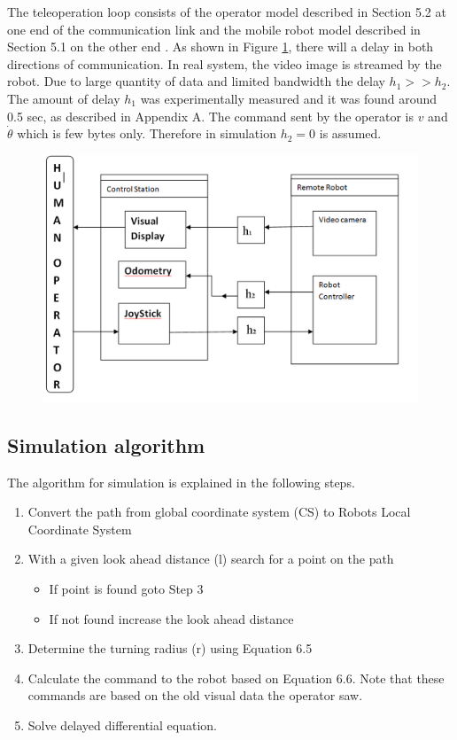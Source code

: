 The teleoperation loop consists of the operator model described in Section 5.2 at one end of the communication link and the mobile robot model described in Section 5.1 on the other end . As shown in Figure \ref{fig:teleloop}, there will a delay in both directions of communication. In real system, the video image is streamed  by the robot. Due to large quantity of data and limited bandwidth the delay $h_1>>h_2$. The amount of delay $h_1$ was experimentally measured  and it was found around 0.5 sec, as described in Appendix A. The command sent by the operator is  $v$ and $\dot{\theta}$ which is few bytes only.  Therefore in simulation  $h_2=0$ is assumed.


\begin{figure}
	\includegraphics[width=\linewidth,keepaspectratio]{Chapter6/fig/BlockTimeDelay2}
	\label{fig:teleloop} 
\end{figure}


\subsection{Simulation algorithm} 
The algorithm for simulation is explained in the following steps.
\begin{enumerate}
\item Convert the path from global coordinate system (CS) to Robots Local Coordinate System
\item With a given look ahead distance (l) search for a point on the path
\begin{itemize}
\item If point is found goto Step 3
\item If not found increase the look ahead distance 
\end{itemize}
\item Determine the turning radius (r) using Equation 6.5
\item Calculate the command to the robot based on Equation 6.6. Note that these commands are based on the old visual data the operator saw.
\item Solve delayed  differential equation.
\end{enumerate}

